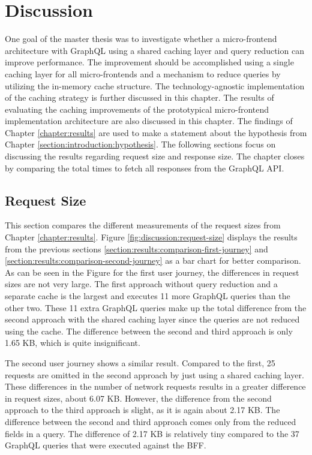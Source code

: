 \chapter{Discussion}\label{chapter:discussion}

One goal of the master thesis was to investigate whether a micro-frontend architecture with GraphQL using a shared caching layer and query reduction can improve performance. The improvement should be accomplished using a single caching layer for all micro-frontends and a mechanism to reduce queries by utilizing the in-memory cache structure. The technology-agnostic implementation of the caching strategy is further discussed in this chapter. The results of evaluating the caching improvements of the prototypical micro-frontend implementation architecture are also discussed in this chapter. The findings of Chapter \ref{chapter:results} are used to make a statement about the hypothesis from Chapter \ref{section:introduction:hypothesis}. The following sections focus on discussing the results regarding request size and response size. The chapter closes by comparing the total times to fetch all responses from the GraphQL \ac{API}.

\section{Request Size}\label{section:discussion:request-size}

This section compares the different measurements of the request sizes from Chapter \ref{chapter:results}. Figure \ref{fig:discussion:request-size} displays the results from the previous sections \ref{section:results:comparison-first-journey} and \ref{section:results:comparison-second-journey} as a bar chart for better comparison. As can be seen in the Figure for the first user journey, the differences in request sizes are not very large. The first approach without query reduction and a separate cache is the largest and executes 11 more GraphQL queries than the other two. These 11 extra GraphQL queries make up the total difference from the second approach with the shared caching layer since the queries are not reduced using the cache. The difference between the second and third approach is only 1.65 KB, which is quite insignificant.

\bigskip

\noindent The second user journey shows a similar result. Compared to the first, 25 requests are omitted in the second approach by just using a shared caching layer. These differences in the number of network requests results in a greater difference in request sizes, about 6.07 KB. However, the difference from the second approach to the third approach is slight, as it is again about 2.17 KB. The difference between the second and third approach comes only from the reduced fields in a query. The difference of 2.17 KB is relatively tiny compared to the 37 GraphQL queries that were executed against the \ac{BFF}.


